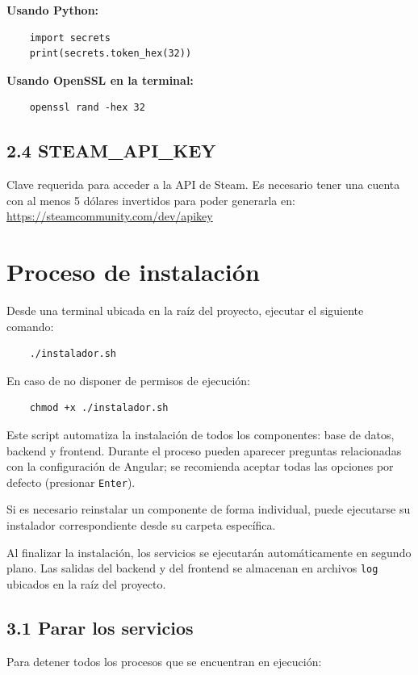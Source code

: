 \textbf{Usando Python:}
\begin{verbatim}
	import secrets
	print(secrets.token_hex(32))
\end{verbatim}

\textbf{Usando OpenSSL en la terminal:}
\begin{verbatim}
	openssl rand -hex 32
\end{verbatim}

\subsection*{2.4 STEAM\_API\_KEY}
Clave requerida para acceder a la API de Steam. Es necesario tener una cuenta con al menos 5 dólares invertidos para poder generarla en:  
\url{https://steamcommunity.com/dev/apikey}

\newpage

\section*{Proceso de instalación}

Desde una terminal ubicada en la raíz del proyecto, ejecutar el siguiente comando:

\begin{verbatim}
	./instalador.sh
\end{verbatim}

En caso de no disponer de permisos de ejecución:

\begin{verbatim}
	chmod +x ./instalador.sh
\end{verbatim}

Este script automatiza la instalación de todos los componentes: base de datos, backend y frontend. Durante el proceso pueden aparecer preguntas relacionadas con la configuración de Angular; se recomienda aceptar todas las opciones por defecto (presionar \texttt{Enter}).

Si es necesario reinstalar un componente de forma individual, puede ejecutarse su instalador correspondiente desde su carpeta específica.

Al finalizar la instalación, los servicios se ejecutarán automáticamente en segundo plano. Las salidas del backend y del frontend se almacenan en archivos \texttt{log} ubicados en la raíz del proyecto.

\subsection*{3.1 Parar los servicios}
Para detener todos los procesos que se encuentran en ejecución:

